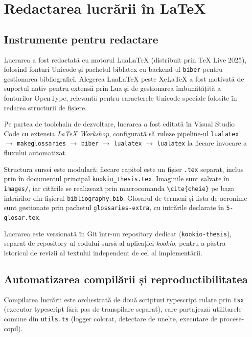 
\section{Redactarea lucrării în \LaTeX{}}\label{anexa:redactare}

\subsection{Instrumente pentru redactare}\label{subsec:instrumente-redactare}

Lucrarea a fost redactată cu motorul LuaLaTeX (distribuit prin TeX Live 2025), folosind fonturi Unicode și pachetul biblatex cu backend-ul \texttt{biber} pentru gestionarea bibliografiei.
Alegerea LuaLaTeX peste XeLaTeX a fost motivată de suportul nativ pentru extensii prin Lua și de gestionarea îmbunătățită a fonturilor OpenType, relevantă pentru caracterele Unicode speciale folosite în redarea structurii de fișiere.

Pe partea de toolchain de dezvoltare, lucrarea a fost editată în Visual Studio Code cu extensia \textit{LaTeX Workshop}, configurată să ruleze pipeline-ul \texttt{lualatex} \(\rightarrow\) \texttt{makeglossaries} \(\rightarrow\) \texttt{biber} \(\rightarrow\) \texttt{lualatex} \(\rightarrow\) \texttt{lualatex} la fiecare invocare a fluxului automatizat.

Structura sursei este modulară: fiecare capitol este un fișier \texttt{.tex} separat, inclus prin \verb|| în documentul principal \texttt{kookio\_thesis.tex}.
Imaginile sunt salvate în \texttt{images/}, iar citările se realizează prin macrocomanda \verb|\cite{cheie}| pe baza intrărilor din fișierul \texttt{bibliography.bib}.
Glosarul de termeni și lista de acronime sunt gestionate prin pachetul \texttt{glossaries-extra}, cu intrările declarate în \texttt{5-glosar.tex}.

Lucrarea este versionată în Git într-un repository dedicat (\texttt{kookio-thesis}), separat de repository-ul codului sursă al aplicației \textit{\gls{kookio}}, pentru a păstra istoricul de revizii al textului independent de cel al implementării.

\subsection{Automatizarea compilării și reproductibilitatea}\label{subsec:automatizare-build}

Compilarea lucrării este orchestrată de două scripturi \gls{typescript} rulate prin \texttt{tsx} (executor \gls{typescript} fără pas de transpilare separat), care partajează utilitarele comune din \texttt{utils.ts} (logger colorat, detectare de unelte, executare de procese-copil).

